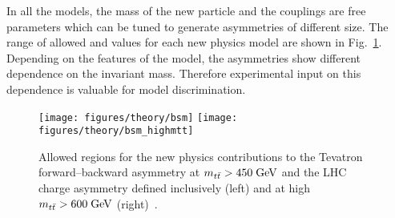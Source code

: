 In all the models, the mass of the new particle and the couplings are
free parameters which can be tuned to generate asymmetries of
different size. The range of allowed \ac{} and \afb{} values for each
new physics model are shown in Fig.~\ref{fig:bsmmodels}. Depending on
the features of the model, the asymmetries show different dependence
on the \ttbar{} invariant mass. Therefore experimental input on this
dependence is valuable for model discrimination. 

\begin{figure}[!htb]
  \centering
  \texttt{[image: figures/theory/bsm]} 
  \texttt{[image: figures/theory/bsm\_highmtt]} 
  \caption{Allowed regions for the new physics contributions to the
    Tevatron forward--backward asymmetry at $m_{t\bar{t}}{}>450\; \mathrm{GeV}$ and the
    LHC charge asymmetry defined inclusively (left) and at high
    $m_{t\bar{t}}{}>600\; \mathrm{GeV}{}$ (right)~\cite{AguilarSaavedra:2011hz}.} 
  \label{fig:bsmmodels}
\end{figure}


